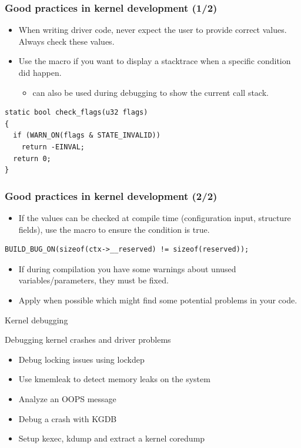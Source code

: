 \begin{frame}[fragile]
  \frametitle{Good practices in kernel development (1/2)}
  \begin{itemize}
    \item When writing driver code, never expect the user to provide correct
          values. Always check these values.
    \item Use the  macro if you want to display a stacktrace when
      a specific condition did happen.
    \begin{itemize}
      \item {} can also be used during debugging to
        show the current call stack.
    \end{itemize}
  \end{itemize}
  \begin{block}{}
    \begin{verbatim}
static bool check_flags(u32 flags)
{
  if (WARN_ON(flags & STATE_INVALID))
    return -EINVAL;
  return 0;
}
    \end{verbatim}
  \end{block}
\end{frame}

\begin{frame}[fragile]
  \frametitle{Good practices in kernel development (2/2)}
  \begin{itemize}
    \item If the values can be checked at compile time (configuration input,
           structure fields), use the  macro to
          ensure the condition is true.
  \end{itemize}
  \begin{block}{}
    \begin{verbatim}
BUILD_BUG_ON(sizeof(ctx->__reserved) != sizeof(reserved));
    \end{verbatim}
  \end{block}
  \begin{itemize}
    \item If during compilation you have some warnings about unused
          variables/parameters, they must be fixed.
    \item Apply  when possible which might find some
          potential problems in your code.
  \end{itemize}
\end{frame}

\setuplabframe
{Kernel debugging}
{
  Debugging kernel crashes and driver problems
  \begin{itemize}
    \item Debug locking issues using lockdep
    \item Use kmemleak to detect memory leaks on the system
    \item Analyze an OOPS message
    \item Debug a crash with KGDB
    \item Setup kexec, kdump and extract a kernel coredump
  \end{itemize}
}